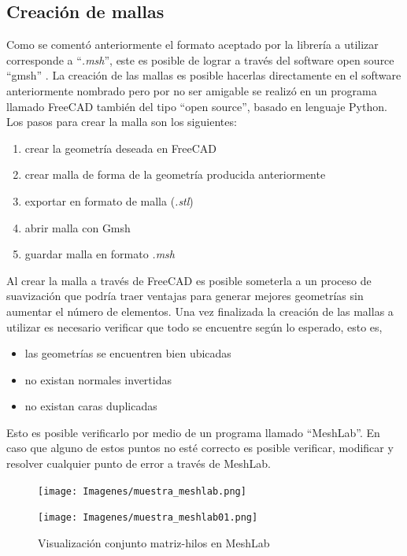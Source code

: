\documentclass[12pt,letterpaper]{article}
\numberwithin{equation}{section}
\begin{document}
\subsection{Creación de mallas}
Como se comentó anteriormente el formato aceptado por la librería a utilizar corresponde a ``\textit{.msh}'', este es posible de lograr a través del software open source ``gmsh'' \cite{paginaGmsh}. La creación de las mallas es posible hacerlas directamente en el software anteriormente nombrado pero por no ser amigable se realizó en un programa llamado FreeCAD también del tipo ``open source'', basado en lenguaje Python. Los pasos para crear la malla son los siguientes:

\begin{enumerate}
	\item crear la geometría deseada en FreeCAD
	\item crear malla de forma de la geometría producida anteriormente
	\item exportar en formato de malla (\textit{.stl})
	\item abrir malla con Gmsh
	\item guardar malla en formato \textit{.msh}
\end{enumerate}

Al crear la malla a través de FreeCAD es posible someterla a un proceso de suavización que podría traer ventajas para generar mejores geometrías sin aumentar el número de elementos. Una vez finalizada la creación de las mallas a utilizar es necesario verificar que todo se encuentre según lo esperado, esto es,

\begin{itemize}
	\item las geometrías se encuentren bien ubicadas
	\item no existan normales invertidas
	\item no existan caras duplicadas
\end{itemize}

Esto es posible verificarlo por medio de un programa llamado ``MeshLab''. En caso que alguno de estos puntos no esté correcto es posible verificar, modificar y resolver cualquier punto de error a través de MeshLab.

\begin{figure}[H]
	\begin{minipage}{0.5\linewidth}
		\hspace{-15mm}
		\centering\texttt{[image: Imagenes/muestra\_meshlab.png]}\\
	\end{minipage}
	\begin{minipage}{0.5\linewidth}
		\centering\texttt{[image: Imagenes/muestra\_meshlab01.png]}\\
	\end{minipage}
	\caption{Visualización conjunto matriz-hilos en MeshLab}
	\label{fig:Muestrameshlab}
\end{figure}
\end{document}
